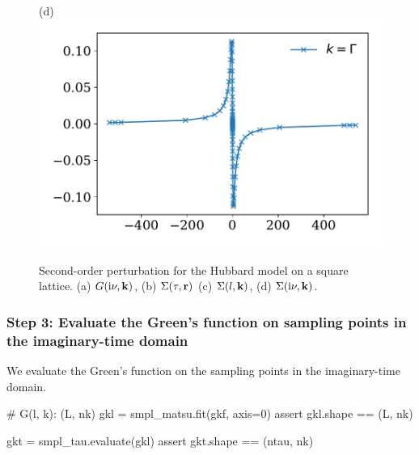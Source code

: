 \documentclass[submission, LectureNotes]{SciPost}
\newcommand{\bk}{\ensuremath{{\bf k}}}
\newcommand{\br}{\ensuremath{{\bf r}}}
\newcommand\ii{\mathrm{i}}%
\newcommand\iv{\ii\nu}%
\begin{document}
\begin{figure}
\begin{minipage}{0.5\columnwidth}
    \end{minipage}
    \begin{minipage}{0.5\columnwidth}
        \centering
        (d)
        \includegraphics[width=\columnwidth]{second_order_sigma_iv.pdf}
    \end{minipage}
%
%
%

    \caption{
        Second-order perturbation for the Hubbard model on a square lattice.
        (a) $G(\iv, \bk)$,
        (b) $\Sigma(\tau, \br)$
        (c) $\Sigma(l, \bk)$,
        (d) $\Sigma(\iv, \bk)$.
    }
    \label{fig:second_order_result}
\end{figure}


\subsubsection*{Step 3: Evaluate the Green's function on sampling points in the imaginary-time domain}
We evaluate the Green's function on the sampling points in the imaginary-time domain.
\begin{python}
# G(l, k): (L, nk)
gkl = smpl_matsu.fit(gkf, axis=0)
assert gkl.shape == (L, nk)

gkt = smpl_tau.evaluate(gkl)
assert gkt.shape == (ntau, nk)
\end{python}
\end{document}

